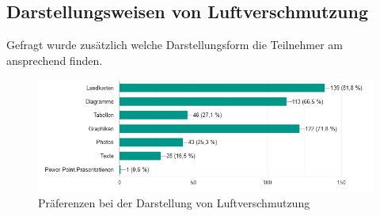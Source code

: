 \subsection{Darstellungsweisen von Luftverschmutzung}
Gefragt wurde zusätzlich welche Darstellungsform die Teilnehmer am ansprechend finden.
\begin{figure}[h]
    \centering
    \includegraphics[width=1\textwidth]{media/diagram/darstellung.png}
    \caption{Präferenzen bei der Darstellung von Luftverschmutzung}
\end{figure}
